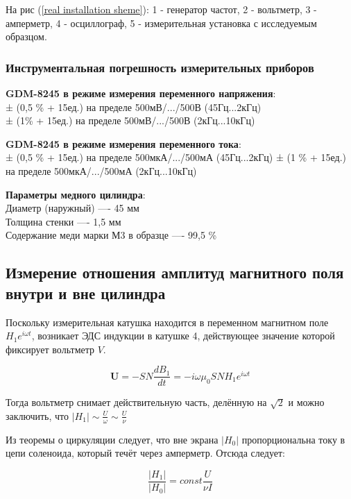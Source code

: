 \documentclass[a4paper, 12pt]{article} %
\begin{document}
На рис (\ref{real installation sheme}): 1 - генератор частот, 2 - вольтметр, 3 - амперметр, 4 - осциллограф, 5 - измерительная установка с исследуемым образцом.

\subsubsection{Инструментальная погрешность измерительных приборов}

\textbf{GDM-8245 в режиме измерения переменного напряжения}:\\ 
± (0,5 \% + 15ед.) на пределе 500мВ/.../500В (45Гц...2кГц) \\
± (1\% + 15ед.) на пределе 500мВ/.../500В (2кГц...10кГц)

\textbf{GDM-8245 в режиме измерения переменного тока}:\\ 
± (0,5 \% + 15ед.) на пределе 500мкА/.../500мА (45Гц...2кГц)
± (1 \% + 15ед.) на пределе 500мкА/.../500мА (2кГц...10кГц)

\textbf{Параметры медного цилиндра}: \\
Диаметр (наружный) ---- 45 мм \\
Толщина стенки ---- 1,5 мм \\
Содержание меди марки М3 в образце ---- 99,5 \%

\subsection{Измерение отношения амплитуд магнитного поля внутри и вне цилиндра}
Поскольку измерительная катушка находится в переменном магнитном поле $H_1 e^{i \omega t}$, возникает ЭДС индукции в катушке 4, действующее значение которой фиксирует вольтметр $V$.

\begin{equation}
    \mathbf{U} = - SN \frac{dB_1}{dt} = - i \omega \mu_0 S N H_1 e^{i \omega t}
    \label{voltmetr, Y channel}
\end{equation}

Тогда вольтметр снимает действительную часть, делённую на $\sqrt{2}$ и можно заключить, что $|H_1| \sim \frac{U}{\omega} \sim \frac{U}{\nu}$

Из теоремы о циркуляции следует, что вне экрана $|H_0|$ пропорциональна току в цепи соленоида, который течёт через амперметр. Отсюда следует:

\begin{equation}
    \frac{|H_1|}{|H_0|} = const \frac{U}{\nu I}
    \label{attenuation coefficient}
\end{equation}
\end{document}
